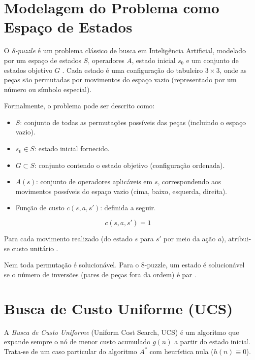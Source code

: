 \section{Modelagem do Problema como Espaço de Estados}  
  
O \emph{8-puzzle} é um problema clássico de busca em Inteligência Artificial, modelado por um espaço de estados $S$, operadores $A$, estado inicial $s_0$ e um conjunto de estados objetivo $G$ \cite{russell2010artificial}. Cada estado é uma configuração do tabuleiro $3\times 3$, onde as peças são permutadas por movimentos do espaço vazio (representado por um número ou símbolo especial).  
  
Formalmente, o problema pode ser descrito como:  
\begin{itemize}  
    \item $S$: conjunto de todas as permutações possíveis das peças (incluindo o espaço vazio).  
    \item $s_0 \in S$: estado inicial fornecido.  
    \item $G \subset S$: conjunto contendo o estado objetivo (configuração ordenada).  
    \item $A(s)$: conjunto de operadores aplicáveis em $s$, correspondendo aos movimentos possíveis do espaço vazio (cima, baixo, esquerda, direita).  
    \item Função de custo $c(s, a, s')$: definida a seguir.  
\end{itemize}  
  
\begin{equation}  
    c(s, a, s') = 1  
\end{equation}  
  
\noindent  
Para cada movimento realizado (do estado $s$ para $s'$ por meio da ação $a$), atribui-se custo unitário \cite{russell2010artificial}.  
  
Nem toda permutação é solucionável. Para o 8-puzzle, um estado é solucionável se o número de inversões (pares de peças fora da ordem) é par \cite{nilsson1998}.  
  
\section{Busca de Custo Uniforme (UCS)}  
  
A \emph{Busca de Custo Uniforme} (Uniform Cost Search, UCS) é um algoritmo que expande sempre o nó de menor custo acumulado $g(n)$ a partir do estado inicial. Trata-se de um caso particular do algoritmo $A^*$ com heurística nula ($h(n) \equiv 0$).  
  
